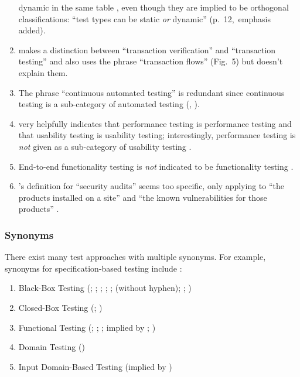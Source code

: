 \begin{enumerate}
            dynamic in the same table \citep[Tab.~2]{Gerrard2000a}, even though
            they are implied to be orthogonal classifications: ``test
            types can be static \emph{or} dynamic'' (p.~12,~emphasis added).
      \item \citeauthor{Gerrard2000a} makes a distinction between ``transaction
            verification'' and ``transaction testing''
            \citeyearpar[Tab.~2]{Gerrard2000a} and also uses the phrase
            ``transaction flows'' (Fig.~5) but doesn't explain them.
      \item The phrase ``continuous automated testing''  \citep[p.~11]{Gerrard2000a}
            is redundant since continuous testing is a sub-category of automated
            testing (\citealp[p.~35]{IEEE2022}, \citealpISTQB{}).
      \item \citeauthor{Gerrard2000a} very helpfully indicates that performance
            testing is performance testing and that usability testing is
            usability testing; interestingly, performance testing is \emph{not}
            given as a sub-category of usability testing
            \citeyearpar[Tab.~2]{Gerrard2000a}.
      \item End-to-end functionality testing is \emph{not} indicated to be
            functionality testing \citep[Tab.~2]{Gerrard2000a}.
      \item \citeauthor{Gerrard2000b}'s definition for ``security audits''
            seems too specific, only applying to ``the products installed on a
            site'' and ``the known vulnerabilities for those products''
            \citeyearpar[p.~28]{Gerrard2000b}.
\end{enumerate}


\subsubsection{Synonyms}
There exist many test approaches with multiple synonyms. For example, synonyms
for specification-based testing include :
\begin{enumerate}
      \item Black-Box Testing (\citealp[p.~9]{IEEE2022}; \citeyear[p.~8]{IEEE2021};
            \citeyear[p.~431]{IEEE2017}; \citealp[p.~5-10]{SWEBOK2024};
            \citealpISTQB{}; \citealp[p.~46]{Firesmith2015} (without hyphen);
            \citealp[p.~344]{SakamotoEtAl2013}; \citealp[p.~399]{vanVliet2000})
      \item Closed-Box Testing (\citealp[p.~9]{IEEE2022}; \citeyear[p.~431]{IEEE2017})
      \item Functional Testing (\citeyear[p.~196]{IEEE2017}; \citealp[p.~44]{Kam2008};
            \citealp[p.~399]{vanVliet2000}; implied by \citeyear[p.~129]{IEEE2021};
            \citeyear[p.~431]{IEEE2017})
      \item Domain Testing (\citealp[p.~5-10]{SWEBOK2024})
      \item Input Domain-Based Testing (implied by \citealp[p.~4-8]{SWEBOK2014})
\end{enumerate}

